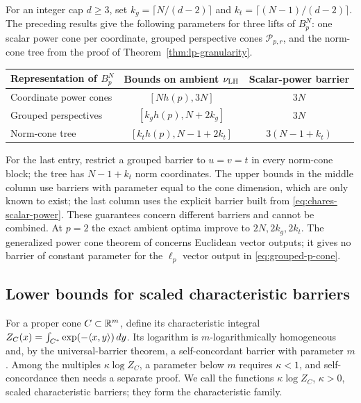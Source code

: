 For an integer cap $d\geq3$, set
$k_g=\lceil N/(d-2)\rceil$ and
$k_t=\lceil(N-1)/(d-2)\rceil$. The preceding results give the
following parameters for three lifts of $B_p^N$: one scalar power cone
per coordinate, grouped perspective cones $\mathcal P_{p,r}$, and the
norm-cone tree from the proof of Theorem~\ref{thm:lp-granularity}.
\begin{center}
\begin{tabular}{@{}lcc@{}}
\toprule
Representation of $B_p^N$ & Bounds on ambient $\nu_{\rm LH}$
 & Scalar-power barrier\\
\midrule
Coordinate power cones & $[Nh(p),3N]$ & $3N$\\
Grouped perspectives & $[k_gh(p),N+2k_g]$ & $3N$\\
Norm-cone tree & $[k_th(p),N-1+2k_t]$ & $3(N-1+k_t)$\\
\bottomrule
\end{tabular}
\end{center}
For the last entry, restrict a grouped barrier to $u=v=t$ in every
norm-cone block; the tree has $N-1+k_t$ norm coordinates.
The upper bounds in the middle column use barriers with parameter
equal to the cone dimension, which are only known to exist; the last
column uses the explicit barrier built from
\eqref{eq:chares-scalar-power}. These guarantees concern different
barriers and cannot be combined. At $p=2$ the exact
ambient optima improve to $2N,2k_g,2k_t$.
The generalized power cone theorem of \citet{RoyXiao2022} concerns
Euclidean vector outputs; it gives no barrier of constant parameter for
the $\ell_p$ vector output in
\eqref{eq:grouped-p-cone}.

\subsection{Lower bounds for scaled characteristic barriers}
For a proper cone $C\subset\mathbb R^m$, define its characteristic integral
$Z_C(x)=\int_{C^*}\exp(-\langle x,y\rangle)\,dy$.
Its logarithm is $m$-logarithmically homogeneous and, by the
universal-barrier theorem, a self-concordant barrier with parameter $m$
\citep{LeeYue2021}. Among the multiples $\kappa\log Z_C$, a parameter
below $m$ requires $\kappa<1$, and self-concordance then needs a
separate proof. We call the functions $\kappa\log Z_C$, $\kappa>0$,
scaled characteristic barriers; they form the characteristic family.

